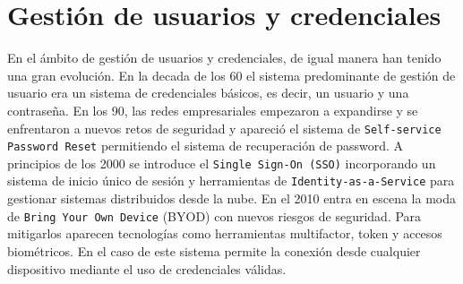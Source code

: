 

\section{Gestión de usuarios y credenciales}

En el ámbito de gestión de usuarios y credenciales, de igual manera han tenido una gran evolución. En la decada de los 60 el sistema predominante de gestión de usuario era un sistema de credenciales básicos, es decir, un usuario y una contraseña. En los 90, las redes empresariales empezaron a expandirse y se enfrentaron a nuevos retos de seguridad y apareció el sistema de \texttt{Self-service Password Reset} permitiendo el sistema de recuperación de password. A principios de los 2000 se introduce el \texttt{Single Sign-On (SSO)} incorporando un sistema de inicio único de sesión y herramientas de \texttt{Identity-as-a-Service} para gestionar sistemas distribuidos desde la nube. En el 2010 entra en escena la moda de \texttt{Bring Your Own Device} (BYOD) con nuevos riesgos de seguridad. Para mitigarlos aparecen tecnologías como herramientas multifactor, token y accesos biométricos. En el caso de este sistema permite la conexión desde cualquier dispositivo mediante el uso de credenciales válidas. \cite{optimalidm_iam_evolution}



